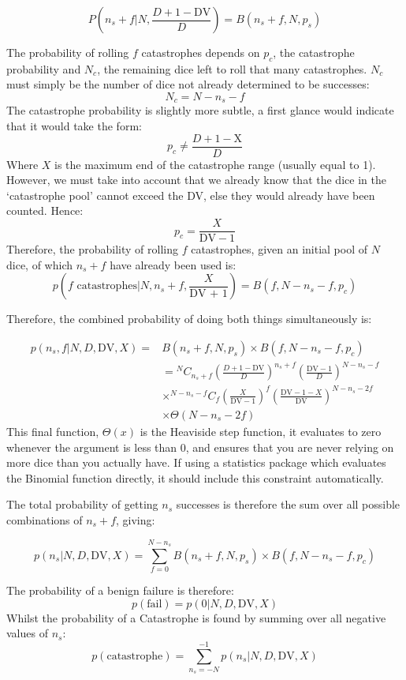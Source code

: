 $$ P\left(n_s + f | N,  \frac{D + 1 - \text{DV}}{D}  \right)  = B(n_s + f , N, p_s ) $$ 

The probability of rolling $f$ catastrophes depends on $p_c$, the catastrophe probability and $N_c$, the remaining dice left to roll that many catastrophes. $N_c$ must simply be the number of dice not already determined to be successes:
$$N_c = N - n_s - f$$
The catastrophe probability is slightly more subtle, a first glance would indicate that it would take the form:
$$ p_c \neq \frac{D + 1 - \text{X}}{D} $$
Where $X$ is the maximum end of the catastrophe range (usually equal to 1). However, we must take into account that we already know that the dice in the `catastrophe pool' cannot exceed the DV, else they would already have been counted. Hence:
$$ p_c = \frac{X}{\text{DV} - 1} $$
Therefore, the probability of rolling $f$ catastrophes, given an initial pool of $N$ dice, of which $n_s + f$ have already been used is:
$$p\left(f \text{ catastrophes} | N, n_s + f, \frac{X}{\text{DV + 1}} \right) = B(f, N- n_s -f, p_c) $$ 

Therefore, the combined probability of doing both things simultaneously is:

\begin{align*}
 p(n_s, f | N, D, \text{DV}, X)  =& B(n_s + f, N,p_s) \times B(f,N - n_s - f, p_c)
 \\
 & = {^N}C_{n_s + f} \left(\frac{D + 1 - \text{DV}}{D} \right)^{n_s + f} \left( \frac{ \text{DV} - 1}{D} \right)^{N - n_s - f}
 \\ 
	& \times {^{N - n_s - f}}C_f \left( \frac{X}{\text{DV} - 1} \right)^f \left(\frac{\text{DV} - 1 - X}{\text{DV}} \right)^{N - n_s - 2f}
	\\
	& \times \Theta(N - n_s - 2 f)
 \end{align*}
This final function, $\Theta(x)$ is the Heaviside step function, it evaluates to zero whenever the argument is less than 0, and ensures that you are never relying on more dice than you actually have. If using a statistics package which evaluates the Binomial function directly, it should include this constraint automatically. 

The total probability of getting $n_s$ successes is therefore the sum over all possible combinations of $n_s + f$, giving:

$$ p(n_s | N,D, \text{DV},X) = \sum_{f = 0}^{N - n_s}B(n_s + f, N,p_s) \times B(f,N - n_s - f, p_c)$$

The probability of a benign failure is therefore:
$$ p(\text{fail}) = p(0 | N,D, \text{DV}, X)$$
Whilst the probability of a Catastrophe is found by summing over all negative values of $n_s$:
$$ p(\text{catastrophe}) = \sum_{n_s = - N}^{-1} p(n_s | N, D, \text{DV}, X)$$


